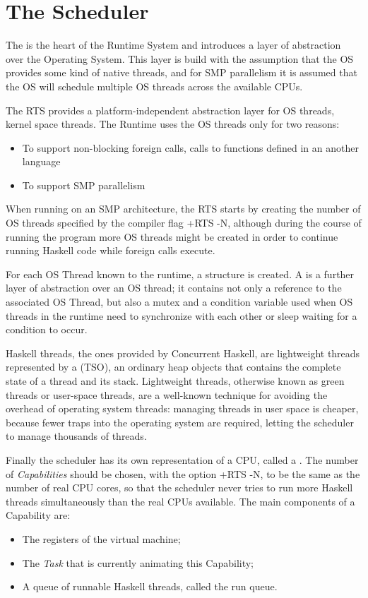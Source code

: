 \section{The Scheduler}
The   is the heart of the Runtime System and introduces a layer of abstraction over the Operating System.
This layer is build with the assumption that the OS provides some kind of native threads, and for SMP parallelism it is assumed that the OS will schedule multiple OS threads across the available CPUs.

The RTS provides a platform-independent abstraction layer for OS threads, \ie kernel space threads. The Runtime uses the OS threads only for two reasons:
\begin{itemize}
\item To support non-blocking foreign calls, \ie calls to functions defined in an another language
\item To support SMP parallelism
\end{itemize}

When running on an SMP architecture, the RTS starts by creating the number of OS threads specified by the compiler flag +RTS -N, although during the course of running the program more OS threads might be created in order to continue running Haskell code while foreign calls execute.

For each OS Thread known to the runtime, a  structure is created. A  is a further layer of abstraction over an OS thread; it contains not only a reference to the associated OS Thread, but also a mutex and a condition variable used when OS threads in the runtime need to synchronize with each other or sleep waiting for a condition to occur.

Haskell threads, the ones provided by Concurrent Haskell, are lightweight threads represented by a  (TSO), an ordinary heap objects that contains the complete state of a thread and its stack.
Lightweight threads, otherwise known as green threads or user-space threads,
are a well-known technique for avoiding the overhead of operating system threads: managing threads in user space is cheaper, because fewer traps into the operating system are required, letting the scheduler to manage thousands of threads.

Finally the scheduler has its own representation of a CPU, called a . The number of \emph{Capabilities} should be chosen, with the option +RTS -N, to be the same as the number of real CPU cores, so that the scheduler never tries to run more Haskell threads simultaneously than the real CPUs available.
The main components of a Capability are:
\begin{itemize}
\item The registers of the virtual machine;
\item The \emph{Task} that is currently animating this Capability;
\item A queue of runnable Haskell threads, called the run queue.
\end{itemize}


